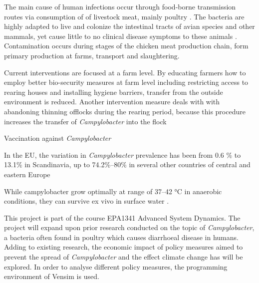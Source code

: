 The main cause of human infections occur through food-borne transmission routes via consumption of of livestock meat, mainly poultry \cite{wilson_tracing_2008}. The bacteria are highly adapted to live and colonize the intestinal tracts of avian species and other mammals, yet cause little to no clinical disease symptoms to these animals \cite{saif_diseases_2008}. Contamination occurs during stages of the chicken meat production chain, form primary production at farms, transport and slaughtering. %

Current interventions are focused at a farm level. By educating farmers how to employ better bio-security measures at farm level including restricting access to rearing houses and installing hygiene barriers, transfer from the outside environment is reduced. Another intervention measure deals with with abandoning thinning offlocks during the rearing period, because this procedure increases the transfer of \textit{Campylobacter} into the flock


Vaccination against \textit{Campylobacter} %


In the EU, the variation in \textit{Campylobacter} prevalence has been from 0.6 \% to 13.1\% in Scandinavia, up to 74.2\%–80\% in  several  other  countries of central and eastern Europe \cite{noauthor_campylobacteriosis_nodate} %

While campylobacter grow optimally at range of 37–42 °C \cite{bronowski_role_2014} in anaerobic conditions, they can survive ex vivo in surface water \cite{wilson_tracing_2008}.
















This project is part of the course EPA1341 Advanced System Dynamics. The project will expand upon prior research conducted on the topic of \textit{Campylobacter}, a bacteria often found in poultry which causes diarrhoeal disease in humans. Adding to existing research, the economic impact of policy measures aimed to prevent the spread of  \textit{Campylobacter} and the effect climate change has will be explored. In order to analyse different policy measures, the programming environment of Vensim is used. 

